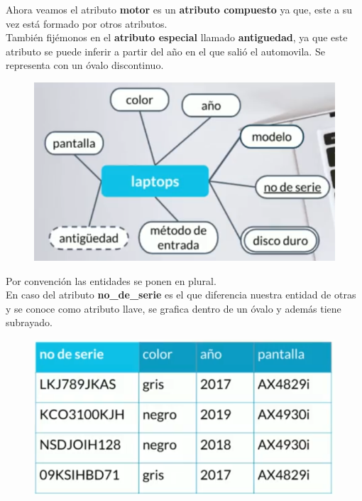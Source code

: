 \documentclass{article}
\begin{document}
Ahora veamos el atributo \textbf{motor} es un \textbf{atributo compuesto} ya
que, este a su vez está formado por otros atributos.\\

También fijémonos en el \textbf{atributo especial} llamado \textbf{antiguedad},
ya que este atributo se puede inferir a partir del año en el que salió el
automovila. Se representa con un óvalo discontinuo.

\newpage

\begin{figure}[h!]
    \centering
      \includegraphics[scale=0.5]{./Pictures/003_atributos.png}
\end{figure}

Por convención las entidades se ponen en plural.\\

En caso del atributo \textbf{no\_de\_serie} es el que diferencia nuestra
entidad de otras y se conoce como atributo llave, se grafica dentro de un óvalo
y además tiene subrayado.

\begin{figure}[h!]
    \centering
      \includegraphics[scale=0.5]{./Pictures/004_id.png}
\end{figure}
\end{document}

